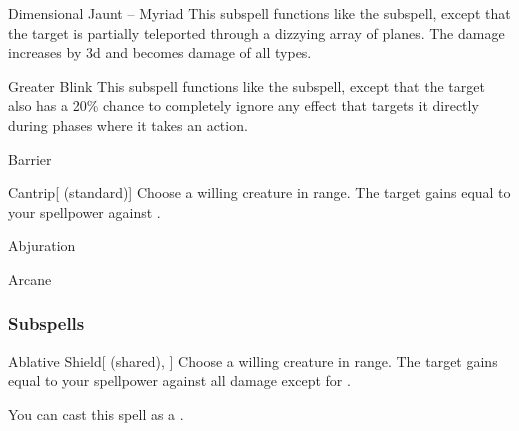 \begin{ability}[\nth{9}]{Dimensional Jaunt -- Myriad}
This subspell functions like the  subspell, except that the target is partially teleported through a dizzying array of planes.
The damage increases by \plus3d and becomes damage of all types.
\end{ability}
\vspace{0.25em}


\begin{ability}[\nth{9}]{Greater Blink}
This subspell functions like the  subspell, except that the target also has a 20\% chance to completely ignore any effect that targets it directly during phases where it takes an action.
\end{ability}
\vspace{0.25em}

\newpage
\begin{spellsection}{Barrier}

\begin{spellheader}
\end{spellheader}


\begin{ability}{Cantrip}[ (standard)]
Choose a willing creature in \rngclose range.
The target gains  equal to your spellpower against .
\end{ability}




 Abjuration

 Arcane
\end{spellsection}


\subsubsection{Subspells}


\begin{ability}[\nth{1}]{Ablative Shield}[ (shared), ]
Choose a willing creature in \rngclose range.
The target gains  equal to your spellpower against all damage except for .

You can cast this spell as a .
\end{ability}
\vspace{0.25em}


